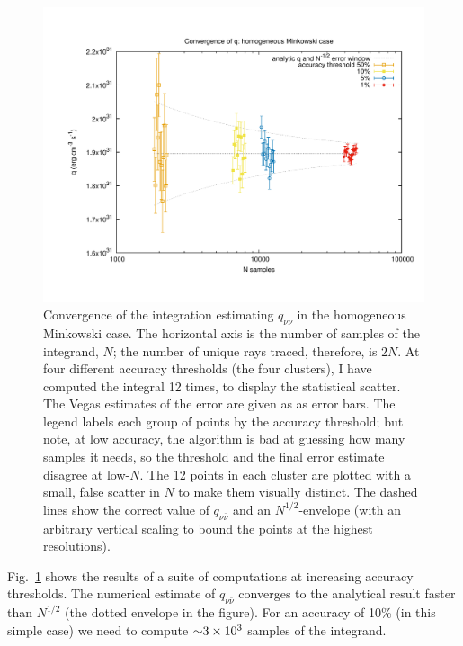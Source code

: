 \begin{figure}
  \centering
  \includegraphics[width=16cm]{Figures/convergence_homogeneous_minkowski}
  \caption[Convergence of $q_{\nu\bar{\nu}}$ in the homogeneous Minkowski case]{
    Convergence of the integration estimating $q_{\nu\bar{\nu}}$ in the
    homogeneous Minkowski case.
    The horizontal axis is the number of samples of the integrand, $N$;
    the number of unique rays traced, therefore, is $2N$.
    At four different accuracy thresholds (the four clusters), I have computed
    the integral 12 times, to display the statistical scatter.
    The Vegas estimates of the error are given as as error bars.
    The legend labels each group of points by the accuracy threshold; but note,
    at low accuracy, the algorithm is bad at guessing how many samples it needs,
    so the threshold and the final error estimate disagree at low-$N$.
    The 12 points in each cluster are plotted with a small, false scatter in $N$
    to make them visually distinct.
    The dashed lines show the correct value of $q_{\nu\bar{\nu}}$ and an
    $N^{1/2}$-envelope (with an arbitrary vertical scaling to bound the points
    at the highest resolutions).
  }
  \label{fig:convergence_homo_mink}
\end{figure}

Fig.~\ref{fig:convergence_homo_mink} shows the results of a suite of
computations at increasing accuracy thresholds.
The numerical estimate of $q_{\nu\bar{\nu}}$ converges to the analytical result
faster than $N^{1/2}$ (the dotted envelope in the figure).
For an accuracy of 10\% (in this simple case) we need to compute
$\mathord{\sim}3\times10^3$ samples of the integrand.

